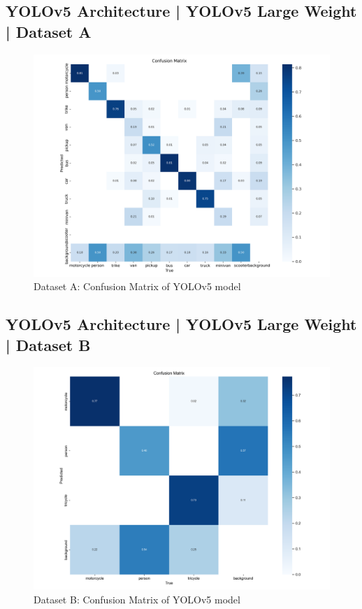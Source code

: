 \documentclass[conference]{IEEEtran}
\begin{document}
	\subsection{YOLOv5 Architecture | YOLOv5 Large Weight | Dataset A}
		\begin{figure}[h]
			\centering
			\includegraphics[width=\columnwidth]{Figures/a_confusion_matrix.png}
			\caption{Dataset A: Confusion Matrix of YOLOv5 model}
			\label{fig:ukDatasetYolov5LargeWeight}
		\end{figure}

	\subsection{YOLOv5 Architecture | YOLOv5 Large Weight | Dataset B}
		\begin{figure}[h]
			\centering
			\includegraphics[width=\columnwidth]{Figures/b_confusion_matrix.png}
			\caption{Dataset B: Confusion Matrix of YOLOv5 model}
			\label{fig:mtpDatasetYolov5LargeWeight}
		\end{figure}
\end{document}
